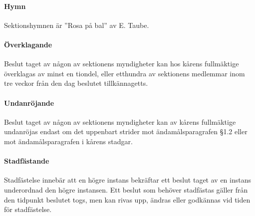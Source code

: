 \documentclass{dsekstatutes}
\begin{document}
\paragraph{Hymn}
Sektionshymnen är ”Rosa på bal” av E. Taube.

\paragraph{Överklagande}
Beslut taget av någon av sektionens myndigheter kan hos kårens fullmäktige
överklagas av minst en tiondel, eller etthundra av sektionens medlemmar inom tre
veckor från den dag beslutet tillkännagetts.

\paragraph{Undanröjande}
Beslut taget av någon av sektionens myndigheter kan av kårens fullmäktige
undanröjas endast om det uppenbart strider mot ändamålsparagrafen §1.2 eller mot
ändamålsparagrafen i kårens stadgar.

\paragraph{Stadfästande}
Stadfästelse innebär att en högre instans bekräftar ett beslut taget av en
instans underordnad den högre instansen. Ett beslut som behöver stadfästas
gäller från den tidpunkt beslutet togs, men kan rivas upp, ändras eller
godkännas vid tiden för stadfästelse.
\end{document}
